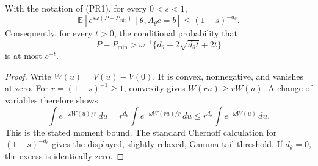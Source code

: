 \begin{corollary}
With the notation of (PR1), for every $0<s<1$,
\[
 \mathbb E\left[e^{s\omega(P-P_{\min})}\mid\theta,A_\theta c=b\right]
 \le(1-s)^{-d_\theta}.
\]
Consequently, for every $t>0$, the conditional probability that
\[
 P-P_{\min}>\omega^{-1}\{d_\theta+2\sqrt{d_\theta t}+2t\}
\]
is at most $e^{-t}$.
\end{corollary}
\begin{proof}
Write $W(u)=V(u)-V(0)$. It is convex, nonnegative, and vanishes at
zero. For $r=(1-s)^{-1}\ge1$, convexity gives $W(ru)\ge rW(u)$.
A change of variables therefore shows
\[
 \int e^{-\omega W(u)/r}\,du
 =r^{d_\theta}\int e^{-\omega W(ru)/r}\,du
 \le r^{d_\theta}\int e^{-\omega W(u)}\,du.
\]
This is the stated moment bound. The standard Chernoff calculation
for $(1-s)^{-d_\theta}$ gives the displayed, slightly relaxed,
Gamma-tail threshold. If $d_\theta=0$, the excess is identically zero.
\end{proof}
